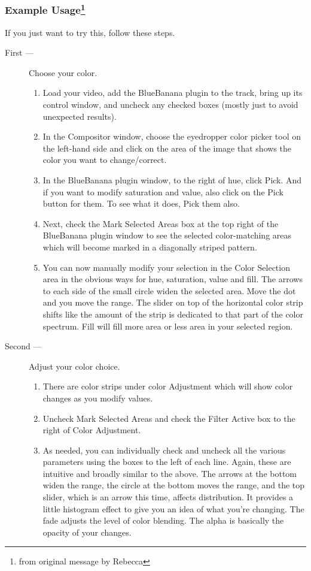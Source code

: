 \subsubsection{Example Usage\protect\footnote{from original message by Rebecca}}
\label{sssec:example_usage}

If you just want to try this, follow these steps.

\begin{description}
    \item[First ---] Choose your color.
    \begin{enumerate}
        \item Load your video, add the BlueBanana plugin to the track, bring up its control window, and uncheck any checked boxes (mostly just to avoid unexpected results).
        \item In the Compositor window, choose the eyedropper color picker tool on the left-hand side and click on the area of the image that shows the color you want to change/correct.
        \item In the BlueBanana plugin window, to the right of hue, click Pick. And if you want to modify saturation and value, also click on the Pick button for them. To see what it does, Pick them also.
        \item Next, check the Mark Selected Areas box at the top right of the BlueBanana plugin window to see the selected color-matching areas which will become marked in a diagonally striped pattern.
        \item You can now manually modify your selection in the Color Selection area in the obvious ways for hue, saturation, value and fill. The arrows to each side of the small circle widen the selected area. Move the dot and you move the range. The slider on top of the horizontal color strip shifts like the amount of the strip is dedicated to that part of the color spectrum. Fill will fill more area or less area in your selected region.
    \end{enumerate}
    \item[Second ---] Adjust your color choice.
    \begin{enumerate}
        \item There are color strips under color Adjustment which will show color changes as you modify values.
        \item Uncheck Mark Selected Areas and check the Filter Active box to the right of Color Adjustment.
        \item As needed, you can individually check and uncheck all the various parameters using the boxes to the left of each line. Again, these are intuitive and broadly similar to the above. The arrows at the bottom widen the range, the circle at the bottom moves the range, and the top slider, which is an arrow this time, affects distribution. It provides a little histogram effect to give you an idea of what you're changing. The fade adjusts the level of color blending. The alpha is basically the opacity of your changes.
    \end{enumerate}
\end{description}


